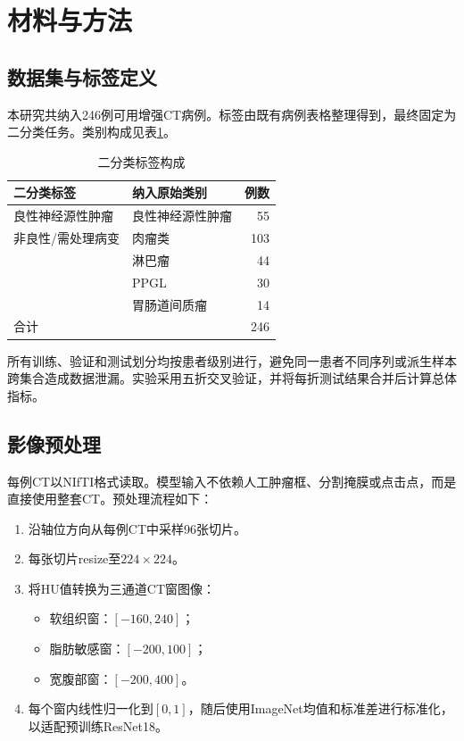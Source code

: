 \documentclass[UTF8,a4paper,11pt]{ctexart}
\begin{document}
\section{材料与方法}

\subsection{数据集与标签定义}

本研究共纳入246例可用增强CT病例。标签由既有病例表格整理得到，最终固定为二分类任务。类别构成见表\ref{tab:dataset}。

\begin{table}[H]
  \centering
  \caption{二分类标签构成}
  \label{tab:dataset}
  \begin{tabular}{llr}
    \toprule
    二分类标签 & 纳入原始类别 & 例数 \\
    \midrule
    良性神经源性肿瘤 & 良性神经源性肿瘤 & 55 \\
    非良性/需处理病变 & 肉瘤类 & 103 \\
     & 淋巴瘤 & 44 \\
     & PPGL & 30 \\
     & 胃肠道间质瘤 & 14 \\
    \midrule
    合计 &  & 246 \\
    \bottomrule
  \end{tabular}
\end{table}

所有训练、验证和测试划分均按患者级别进行，避免同一患者不同序列或派生样本跨集合造成数据泄漏。实验采用五折交叉验证，并将每折测试结果合并后计算总体指标。

\subsection{影像预处理}

每例CT以NIfTI格式读取。模型输入不依赖人工肿瘤框、分割掩膜或点击点，而是直接使用整套CT。预处理流程如下：

\begin{enumerate}
  \item 沿轴位方向从每例CT中采样96张切片。
  \item 每张切片resize至$224 \times 224$。
  \item 将HU值转换为三通道CT窗图像：
  \begin{itemize}
    \item 软组织窗：$[-160, 240]$；
    \item 脂肪敏感窗：$[-200, 100]$；
    \item 宽腹部窗：$[-200, 400]$。
  \end{itemize}
  \item 每个窗内线性归一化到$[0,1]$，随后使用ImageNet均值和标准差进行标准化，以适配预训练ResNet18。
\end{enumerate}
\end{document}
